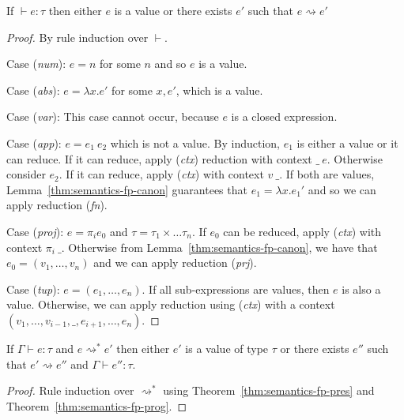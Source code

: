 \begin{theorem}[Progress]
\label{thm:semantics-fp-prog}
  If $\vdash e : \tau$ then either $e$ is a value or there exists $e'$ such that $e \rightsquigarrow e'$
\end{theorem}
\begin{proof}
  By rule induction over $\vdash$.

\vspace{0.25em}\noindent\hangindent=0.6cm
Case (\emph{num}): $e = n$ for some $n$ and so $e$ is a value.

\vspace{0.25em}\noindent\hangindent=0.6cm
Case (\emph{abs}): $e = \lambda x.e'$ for some $x, e'$, which is a value.

\vspace{0.25em}\noindent\hangindent=0.6cm
Case (\emph{var}): This case cannot occur, because $e$ is a closed expression.

\vspace{0.25em}\noindent\hangindent=0.6cm
Case (\emph{app}): $e = e_1~e_2$ which is not a value. By induction, $e_1$ is either
a value or it can reduce. If it can reduce, apply (\emph{ctx}) reduction with context $\_~e$. Otherwise
consider $e_2$. If it can reduce, apply (\emph{ctx}) with context $v~\_$. If both are values,
Lemma~\ref{thm:semantics-fp-canon} guarantees that $e_1 = \lambda x.e_1'$ and so we can apply
reduction (\emph{fn}).

\vspace{0.25em}\noindent\hangindent=0.6cm
Case (\emph{proj}): $e = \pi_i e_0$ and $\tau=\tau_1\times\ldots\tau_n$. If $e_0$ can be reduced,
  apply (\emph{ctx}) with context $\pi_i~\_$. Otherwise from Lemma~\ref{thm:semantics-fp-canon},
  we have that $e_0=(v_1, \ldots, v_n)$ and we can apply reduction (\emph{prj}).

\vspace{0.25em}\noindent\hangindent=0.6cm
Case (\emph{tup}): $e = (e_1, \ldots, e_n)$. If all sub-expressions are values, then $e$ is also
  a value. Otherwise, we can apply reduction using (\emph{ctx}) with a context $(v_1, \ldots, v_{i-1}, \_, e_{i+1}, \ldots, e_n)$.
\end{proof}

\begin{theorem}
  If $\Gamma \vdash e : \tau$ and $e \rightsquigarrow^* e'$ then either $e'$ is a value of type $\tau$ or
  there exists $e''$ such that $e' \rightsquigarrow e''$ and $\Gamma \vdash e'' : \tau$.
\end{theorem}
\begin{proof}
  Rule induction over $\rightsquigarrow^*$ using Theorem~\ref{thm:semantics-fp-pres} and Theorem~\ref{thm:semantics-fp-prog}.
\end{proof}

